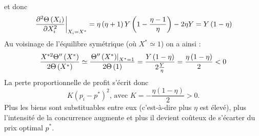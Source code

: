 \documentclass[11pt,a4paper]{article}
\begin{document}
et donc%
\begin{equation*}
\left. \frac{\partial ^{2}\Theta \left( X_{i}\right) }{\partial X_{i}^{2}}%
\right\vert _{X_{i}=X^{\ast }}=\eta \left( \eta +1\right) Y\left( 1-\frac{%
\eta -1}{\eta }\right) -2\eta Y=Y\left( 1-\eta \right)
\end{equation*}%
Au voisinage de l'\'{e}quilibre sym\'{e}trique (o\`{u} $X^{\ast }\simeq 1$)
on a ainsi :%
\begin{equation*}
\frac{X^{\ast 2}\Theta ^{\prime \prime }\left( X^{\ast }\right) }{2\Theta
\left( X^{\ast }\right) }\simeq \frac{\left. \Theta ^{\prime \prime }\left(
X^{\ast }\right) \right\vert _{X^{\ast }=1}}{2\Theta \left( 1\right) }=\frac{%
Y\left( 1-\eta \right) }{2\frac{Y}{\eta }}=\frac{\eta \left( 1-\eta \right) 
}{2}<0
\end{equation*}%
La perte proportionnelle de profit s'\'{e}crit donc%
\begin{equation*}
K\left( p_{i}-p^{\ast }\right) ^{2}\text{, avec }K=-\frac{\eta \left( 1-\eta
\right) }{2}>0.
\end{equation*}%
Plus les biens sont substituables entre eux (c'est-\`{a}-dire plus $\eta $
est \'{e}lev\'{e}), plus l'intensit\'{e} de la concurrence augmente et plus
il devient co\^{u}teux de s'\'{e}carter du prix optimal $p^{\ast }$.
\end{document}
